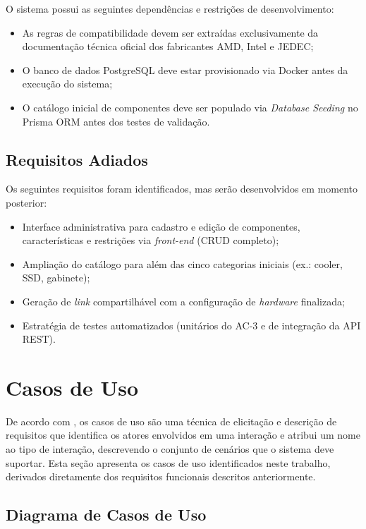 O sistema possui as seguintes dependências e restrições de desenvolvimento:

\begin{itemize}
  \item As regras de compatibilidade devem ser extraídas exclusivamente da documentação técnica oficial dos fabricantes AMD, Intel e JEDEC;
  \item O banco de dados PostgreSQL deve estar provisionado via Docker antes da execução do sistema;
  \item O catálogo inicial de componentes deve ser populado via \textit{Database Seeding} no Prisma ORM antes dos testes de validação.
\end{itemize}

\subsection{Requisitos Adiados}
\label{sec:req-adiados}

Os seguintes requisitos foram identificados, mas serão desenvolvidos em momento posterior:

\begin{itemize}
  \item Interface administrativa para cadastro e edição de componentes, características e restrições via \textit{front-end} (CRUD completo);
  \item Ampliação do catálogo para além das cinco categorias iniciais (ex.: cooler, SSD, gabinete);
  \item Geração de \textit{link} compartilhável com a configuração de \textit{hardware} finalizada;
  \item Estratégia de testes automatizados (unitários do AC-3 e de integração da API REST).
\end{itemize}

\section{Casos de Uso}

De acordo com \textcite{sommerville2011}, os casos de uso são uma técnica de
elicitação e descrição de requisitos que identifica os atores envolvidos em uma
interação e atribui um nome ao tipo de interação, descrevendo o conjunto de
cenários que o sistema deve suportar. Esta seção apresenta os casos de uso
identificados neste trabalho, derivados diretamente dos requisitos funcionais
descritos anteriormente.

\subsection{Diagrama de Casos de Uso}

